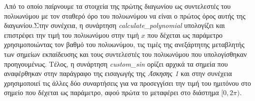 \documentclass[Second Project.tex]{subfiles}
\begin{document}
Από το οποίο παίρνουμε τα στοιχεία της πρώτης διαγωνίου ως συντελεστές του πολυωνύμου με τον σταθερό όρο του πολυωνύμου να είναι ο πρώτος 
όρος αυτής της διαγωνίου.Στην συνέχεια, η συνάρτηση \textlatin{\textit{calculate\_polynomial}} υπολογίζει και επιστρέφει την τιμή του 
πολυωνύμου στην τιμή $x$ που δέχεται ως παράμετρο χρησιμοποιώντας τον βαθμό του πολυωνύμου, τις τιμές της ανεξάρτητης μεταβλητής των σημείων 
εκπαίδευσης και τους συντελεστές του πολυωνύμου που υπολογίσθηκαν προηγουμένως. Τέλος, η συνάρτηση \textlatin{\textit{custom\_sin}} ορίζει 
αρχικά τα σημεία που αναφέρθηκαν στην παράγραφο της εισαγωγής της \textit{Άσκησης 1} και στην συνέχεια χρησιμοποιεί τις άλλες δύο συναρτήσεις 
για να προσεγγίσει την τιμή του ημιτόνου στο σημείο που δέχεται ως παράμετρο, αφού πρώτα το μεταφέρει στο διάστημα $[0,2\pi)$. 
\newpage
\end{document}
